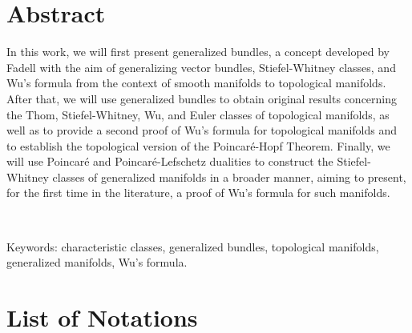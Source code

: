 \documentclass[12pt,oneside]{book}
\begin{document}
    \chapter*{Abstract}
    \thispagestyle{empty}

    In this work, we will first present generalized bundles, a concept developed by Fadell with the aim 
    of generalizing vector bundles, Stiefel-Whitney classes, and Wu's formula from the context of smooth 
    manifolds to topological manifolds. After that, we will use generalized bundles to obtain original 
    results concerning the Thom, Stiefel-Whitney, Wu, and Euler classes of topological manifolds, as 
    well as to provide a second proof of Wu's formula for topological manifolds and to establish the 
    topological version of the Poincaré-Hopf Theorem. Finally, we will use Poincaré and 
    Poincaré-Lefschetz dualities to construct the Stiefel-Whitney classes of generalized manifolds in a 
    broader manner, aiming to present, for the first time in the literature, a proof of Wu's formula 
    for such manifolds.

    \

    \noindent Keywords: characteristic classes, generalized bundles, topological manifolds, generalized 
    manifolds, Wu's formula.



    \tableofcontents
    \thispagestyle{empty}

    \listoffigures
    \thispagestyle{empty}



    \chapter*{List of Notations}
    \thispagestyle{empty}
\end{document}
